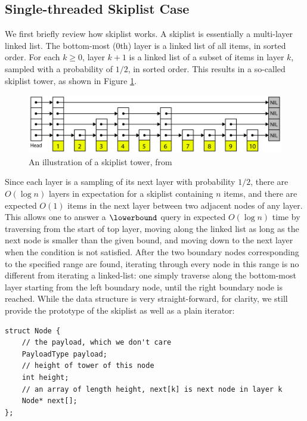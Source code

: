 \documentclass[11pt, usletter]{article}
\begin{document}
\subsection{Single-threaded Skiplist Case} \label{sliter_singlethread}

We first briefly review how skiplist works. 
A skiplist is essentially a multi-layer linked list. 
The bottom-most (0th) layer is a linked list of all items, in sorted order. 
For each $k\geq 0$, layer $k+1$ is a linked list of a subset of items in layer $k$, 
sampled with a probability of $1/2$, in sorted order. 
This results in a so-called skiplist tower, as shown in Figure \ref{skiplist_tower}.
 
\begin{figure}[!htb]
  \includegraphics[width=\linewidth]{skiplistTower.png}
\caption{An illustration of a skiplist tower, from \cite{memsqladamblog}}
\label{skiplist_tower}
\end{figure}

Since each layer is a sampling of its next layer with probability $1/2$, 
there are $O(\log n)$ layers in expectation for a skiplist containing $n$ items, 
and there are expected $O(1)$ items in the next layer between two adjacent nodes of any layer. 
This allows one to answer a $\lowerbound$ query in expected $O(\log n)$ time by traversing from the start of top layer, 
moving along the linked list as long as the next node is smaller than the given bound, 
and moving down to the next layer when the condition is not satisfied. 
After the two boundary nodes corresponding to the specified range are found, 
iterating through every node in this range is no different from iterating a linked-list: 
one simply traverse along the bottom-most layer starting from the left boundary node, until the right boundary node is reached.
While the data structure is very straight-forward, for clarity, 
we still provide the prototype of the skiplist as well as a plain iterator:

\singlespacing\begin{codebox}
\begin{verbatim}
struct Node {
    // the payload, which we don't care
    PayloadType payload;
    // height of tower of this node 
    int height;	
    // an array of length height, next[k] is next node in layer k
    Node* next[]; 
};
\end{verbatim}
\end{codebox}\doublespacing
\end{document}
